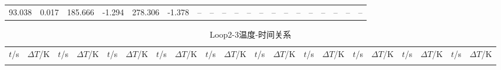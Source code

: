 {\begin{longtable}{cc|cc|cc|cc|cc|cc|cc|cc|cc|cc}
      93.038 &               0.017 &      185.666 &              -1.294 &      278.306 &              -1.378 &          -- &                 -- &          -- &                 -- &          -- &                 -- &          -- &                 -- &          -- &                 -- &          -- &                 -- &          -- &                 -- \\
\end{longtable}
\begin{longtable}{cc|cc|cc|cc|cc|cc|cc|cc|cc|cc}
\toprule
\endhead

\caption{Loop2-3温度-时间关系}\\
\toprule
$t$/\si{s} & $\Delta T$/\si{K} & $t$/\si{s} & $\Delta T$/\si{K} & $t$/\si{s} & $\Delta T$/\si{K} & $t$/\si{s} & $\Delta T$/\si{K} & $t$/\si{s} & $\Delta T$/\si{K} & $t$/\si{s} & $\Delta T$/\si{K} & $t$/\si{s} & $\Delta T$/\si{K} & $t$/\si{s} & $\Delta T$/\si{K} & $t$/\si{s} & $\Delta T$/\si{K} & $t$/\si{s} & $\Delta T$/\si{K} \\
\midrule
\endfirsthead

\bottomrule
\endfoot


\end{longtable}}
